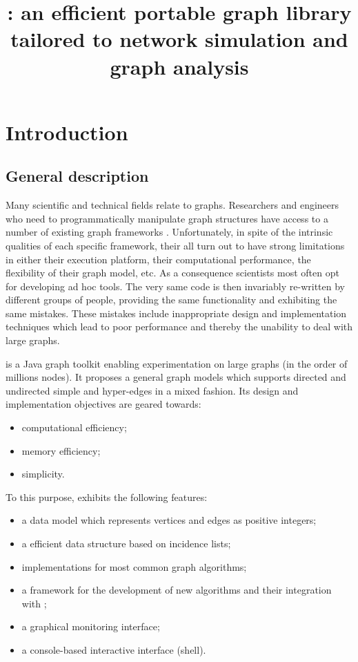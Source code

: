 \documentclass{article}
\title{\grph: an efficient portable graph library tailored to network simulation
and graph analysis}
\begin{document}
\maketitle
\begin{footnotesize}
\vfill
\tableofcontents
\end{footnotesize}
\newpage

\begin{abstract}
\end{abstract}

\section{Introduction}


\subsection{General description}


Many scientific and technical fields relate to graphs. Researchers and
engineers who need to programmatically manipulate graph structures have access  to a number of existing graph frameworks \cite{jungweb, 504206, jgraphtweb, sageweb}. 
Unfortunately, in spite of the intrinsic qualities of each specific framework, their all turn out to have strong limitations
in either their execution platform, their computational performance,  the
flexibility of their graph model, etc.
As a consequence scientists most often opt for developing 
ad hoc  tools. The very same code is then invariably re-written by different groups of people, providing 
the same functionality and exhibiting the same mistakes. These mistakes include inappropriate design and implementation techniques which lead to poor performance and thereby the unability to deal with large graphs.

\grph is a Java graph toolkit enabling experimentation on large graphs (in the order of millions  nodes).
It proposes a general graph models which supports
directed and undirected simple and hyper-edges in a mixed fashion. Its design and implementation objectives are geared towards:
\begin{itemize}
  \item computational efficiency;
  \item memory efficiency;
  \item simplicity.
\end{itemize}

To this purpose, \grph exhibits  the following features:
\begin{itemize}
  \item a data model which represents vertices and edges as positive integers;
  \item a efficient data structure based on incidence lists;
  \item implementations for most common graph algorithms;
  \item a framework for the development of new algorithms and their integration with \grph;
  \item a graphical monitoring interface;
  \item a console-based interactive interface (shell).
\end{itemize}
\end{document}
